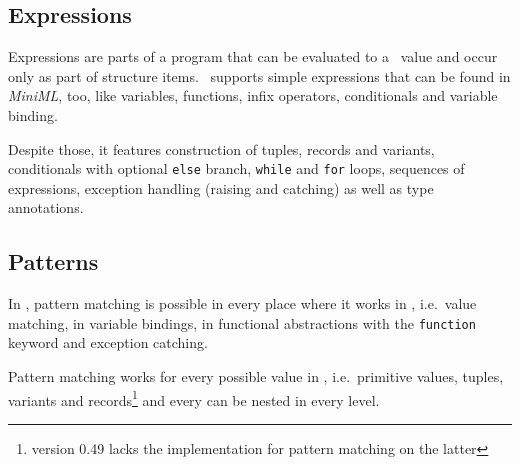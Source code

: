 \subsection*{Expressions}

Expressions are parts of a program that can be evaluated to a \ocaml\ value and
occur only as part of structure items.
\easyocaml\ supports simple expressions that can be found in \textsl{MiniML},
too, like variables, functions, infix operators, conditionals and variable
binding.

Despite those, it features construction of tuples, records and variants,
conditionals with optional \texttt{else} branch, \texttt{while} and
\texttt{for} loops, sequences of expressions, exception handling (raising and
catching) as well as type annotations.

\subsection*{Patterns}

In \easyocaml, pattern matching is possible in every place where it works in
\ocaml, i.e.\ value matching, in variable bindings, in
functional abstractions with the \texttt{function} keyword and exception catching.

Pattern matching works for every possible value in \easyocaml, i.e.\ primitive
values, tuples, variants and records\footnote{version 0.49 lacks the
implementation for pattern matching on the latter} and every can be nested in
every level.

